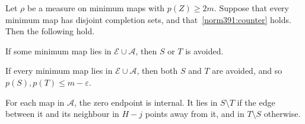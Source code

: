 \begin{lemma}
\label{endpoint405:zero-endpoints}
Let $\rho$ be a measure on minimum maps with $p(Z)\ge2m$. Suppose that every minimum map has disjoint
completion sets, and that~\eqref{norm391:counter} holds. Then the following hold.
\begin{props}
\item If some minimum map lies in $\mathcal E\cup\mathcal A$, then $S$ or $T$ is avoided.\label{zeroend:1}
\item If every minimum map lies in $\mathcal E\cup\mathcal A$, then both
$S$ and $T$ are avoided, and so $p(S),p(T)\le m-\varepsilon$.\label{zeroend:2}
\item For each map in $\mathcal A$, the zero endpoint is internal. It lies in $S\setminus T$ if the edge between it and its neighbour in $H-j$ points away from it, and in $T\setminus S$ otherwise.\label{zeroend:3}
\end{props}
\end{lemma}
